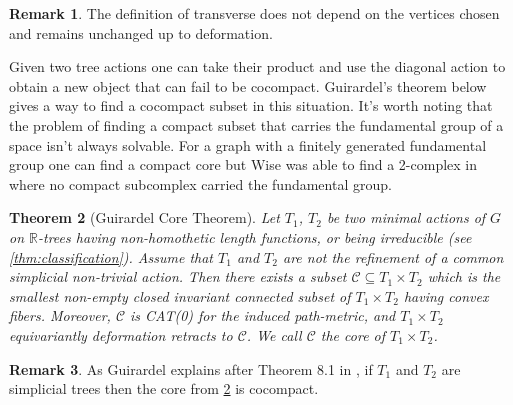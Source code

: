 \documentclass[12pt,parskip=full]{report}
\theoremstyle{plain}
\newtheorem{thm}{Theorem}[section]
\theoremstyle{definition}
\newtheorem{rmk}[thm]{Remark}
\begin{document}
\begin{rmk}
    The definition of transverse does not depend on the vertices chosen and remains unchanged up to deformation. 
\end{rmk}

Given two tree actions one can take their product and use the diagonal action to obtain a new object that can fail to be cocompact. Guirardel's theorem below gives a way to find a cocompact subset in this situation. It's worth noting that the problem of finding a compact subset that carries the fundamental group of a space isn't always solvable. For a graph with a finitely generated fundamental group  one can find a compact core but Wise was able to find a 2-complex in \cite{wisecompactcore} where no compact subcomplex carried the fundamental group.

\begin{thm}
    [Guirardel Core Theorem]
    \label{thm:guirardelcore}
    Let \(T_1\), \(T_2\) be two minimal actions of \(G\) on \(\mathbb{R}\)-trees having non-homothetic length functions, or being irreducible (see \ref{thm:classification}). Assume that \(T_1\) and \(T_2\) are not the refinement of a common simplicial non-trivial action. Then there exists a subset \(\mathscr{C}\subseteq T_1\times T_2\) which is the smallest non-empty closed invariant connected subset of \(T_1\times T_2\) having convex fibers. Moreover, \(\mathscr{C}\) is CAT(0) for the induced path-metric, and \(T_1\times T_2\) equivariantly deformation retracts to \(\mathscr{C}\). We call \(\mathscr{C}\) the core of \(T_1\times T_2\).
\end{thm}

\begin{rmk}
    \label{guirardelcocompact}
    As Guirardel explains after Theorem 8.1 in \cite{guirardelcorepaper}, if \(T_1\) and \(T_2\) are simplicial trees then the core from \ref{thm:guirardelcore} is cocompact.
\end{rmk}
\end{document}
